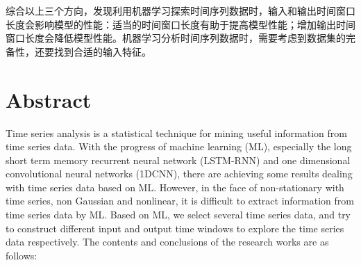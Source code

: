 \begin{enumerate}
  综合以上三个方向，发现利用机器学习探索时间序列数据时，输入和输出时间窗口长度会影响模型的性能：适当的时间窗口长度有助于提高模型性能；增加输出时间窗口长度会降低模型性能。机器学习分析时间序列数据时，需要考虑到数据集的完备性，还要找到合适的输入特征。

\end{enumerate}


\intobmk\chapter*{Abstract}
Time series analysis is a statistical technique for mining useful information from time series data. With the progress of machine learning (ML), especially the long short term memory recurrent neural network (LSTM-RNN) and one dimensional convolutional neural networks (1DCNN), there are achieving some results dealing with time series data based on ML. However, in the face of non-stationary with time series, non Gaussian and nonlinear, it is difficult to extract information from time series data by ML. Based on ML, we select several time series data, and try to construct different input and output time windows to explore the time series data respectively. The contents and conclusions of the research works are as follows:
